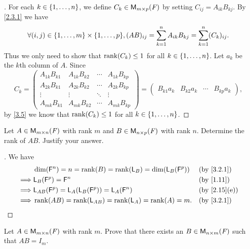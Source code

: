 \begin{proof}[]
  For each \(k \in \left\lbrace1, \dots, n\right\rbrace\), we define \(C_k \in \mathsf{M}_{{m} \times p}({\mathit{F}})\) by setting \(C_{i j} = A_{i k} B_{k j}\).
  By \cref{2.3.1} we have
  \[
    \forall (i, j) \in \set{1, \dots, m} \times \set{1, \dots, p}, (AB)_{i j} = \sum_{k = 1}^n A_{i k} B_{k j} = \sum_{k = 1}^n (C_k)_{i j}.
  \]
  Thus we only need to show that \(\rk{C_k} \leq 1\) for all \(k \in \left\lbrace1, \dots, n\right\rbrace\).
  Let \(a_k\) be the \(k\)th column of \(A\).
  Since
  \[
    C_k = \begin{pmatrix}
      A_{1 k} B_{k 1} & A_{1 k} B_{k 2} & \cdots & A_{1 k} B_{k p} \\
      A_{2 k} B_{k 1} & A_{2 k} B_{k 2} & \cdots & A_{2 k} B_{k p} \\
      \vdots          & \vdots          & \ddots & \vdots          \\
      A_{m k} B_{k 1} & A_{m k} B_{k 2} & \cdots & A_{m k} B_{k p}
    \end{pmatrix} = \begin{pmatrix}
      B_{k 1} a_k & B_{k 2} a_k & \cdots & B_{k p} a_k
    \end{pmatrix},
  \]
  by \cref{3.5} we know that \(\rk{C_k} \leq 1\) for all \(k \in \left\lbrace1, \dots, n\right\rbrace\).
\end{proof}

\begin{ex}\label{ex:3.2.19}
  Let \(A \in \mathsf{M}_{{m} \times n}({\mathit{F}})\) with rank \(m\) and \(B \in \mathsf{M}_{{n} \times p}({\mathit{F}})\) with rank \(n\).
  Determine the rank of \(AB\).
  Justify your answer.
\end{ex}

\begin{proof}[]
  We have
  \begin{align*}
             & \dim(\vs{F}^n) = n = \rk{B} = \rk{\L_B} = \dim(\L_B(\vs{F}^p)) &  & \text{(by \cref{3.2.1})}   \\
    \implies & \L_B(\vs{F}^p) = \vs{F}^n                                      &  & \text{(by \cref{1.11})}    \\
    \implies & \L_{AB}(\vs{F}^p) = \L_A(\L_B(\vs{F}^p)) = \L_A(\vs{F}^n)      &  & \text{(by \cref{2.15}(e))} \\
    \implies & \rk{AB} = \rk{\L_{AB}} = \rk{\L_A} = \rk{A} = m.               &  & \text{(by \cref{3.2.1})}
  \end{align*}
\end{proof}

\setcounter{ex}{20}
\begin{ex}\label{ex:3.2.21}
  Let \(A \in \mathsf{M}_{{m} \times n}({\mathit{F}})\) with rank \(m\).
  Prove that there exists an \(B \in \mathsf{M}_{{n} \times m}({\mathit{F}})\) such that \(AB = I_m\).
\end{ex}

